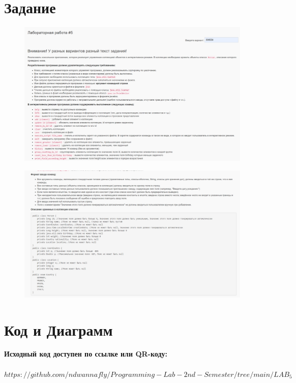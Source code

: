 \section{Задание}

\begin{figure}[H]
\includegraphics[width=\textwidth,height=\textheight,keepaspectratio]{img/task1}
\label{pic:task1}
\end{figure}

\begin{figure}[H]

\includegraphics[width=\textwidth,height=\textheight,keepaspectratio]{img/task2}
\label{pic:task2}
\end{figure}

\newpage
\section{Код и Диаграмм}
\textbf{Исходный код доступен по ссылке или QR-коду:}\\
\\     
\underline{$https://github.com/ndwannafly/Programming-Lab-2nd-Semester/tree/main/LAB_5$}\\


